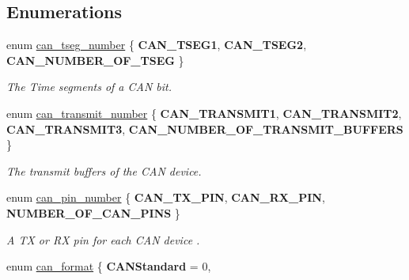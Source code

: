 \subsection*{Enumerations}
\begin{DoxyCompactItemize}
\item 
\mbox{\label{can-defs_8h_ad23f229400eb05bfbbfc7c3306462262}} 
enum \mbox{\hyperlink{can-defs_8h_ad23f229400eb05bfbbfc7c3306462262}{can\+\_\+tseg\+\_\+number}} \{ {\bfseries C\+A\+N\+\_\+\+T\+S\+E\+G1}, 
{\bfseries C\+A\+N\+\_\+\+T\+S\+E\+G2}, 
{\bfseries C\+A\+N\+\_\+\+N\+U\+M\+B\+E\+R\+\_\+\+O\+F\+\_\+\+T\+S\+EG}
 \}
\begin{DoxyCompactList}\small\item\em The Time segments of a C\+AN bit. \end{DoxyCompactList}\item 
\mbox{\label{can-defs_8h_aaac84ad9d9999f0fd9ab4ba86bfbf144}} 
enum \mbox{\hyperlink{can-defs_8h_aaac84ad9d9999f0fd9ab4ba86bfbf144}{can\+\_\+transmit\+\_\+number}} \{ {\bfseries C\+A\+N\+\_\+\+T\+R\+A\+N\+S\+M\+I\+T1}, 
{\bfseries C\+A\+N\+\_\+\+T\+R\+A\+N\+S\+M\+I\+T2}, 
{\bfseries C\+A\+N\+\_\+\+T\+R\+A\+N\+S\+M\+I\+T3}, 
{\bfseries C\+A\+N\+\_\+\+N\+U\+M\+B\+E\+R\+\_\+\+O\+F\+\_\+\+T\+R\+A\+N\+S\+M\+I\+T\+\_\+\+B\+U\+F\+F\+E\+RS}
 \}
\begin{DoxyCompactList}\small\item\em The transmit buffers of the C\+AN device. \end{DoxyCompactList}\item 
\mbox{\label{can-defs_8h_a44bceece888691865a01e7013b126748}} 
enum \mbox{\hyperlink{can-defs_8h_a44bceece888691865a01e7013b126748}{can\+\_\+pin\+\_\+number}} \{ {\bfseries C\+A\+N\+\_\+\+T\+X\+\_\+\+P\+IN}, 
{\bfseries C\+A\+N\+\_\+\+R\+X\+\_\+\+P\+IN}, 
{\bfseries N\+U\+M\+B\+E\+R\+\_\+\+O\+F\+\_\+\+C\+A\+N\+\_\+\+P\+I\+NS}
 \}
\begin{DoxyCompactList}\small\item\em A TX or RX pin for each C\+AN device . \end{DoxyCompactList}\item 
\mbox{\label{can-defs_8h_a7ce922719c6b9d485a23ce2afc0e5cfe}} 
enum \mbox{\hyperlink{can-defs_8h_a7ce922719c6b9d485a23ce2afc0e5cfe}{can\+\_\+format}} \{ {\bfseries C\+A\+N\+Standard} = 0, 

\end{DoxyCompactItemize}
